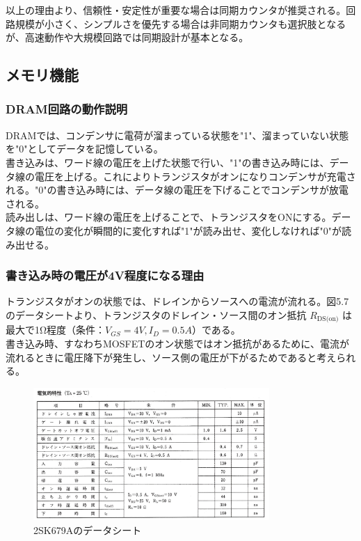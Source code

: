 \documentclass{jlreq}
\numberwithin{equation}{section}
\begin{document}
以上の理由より、信頼性・安定性が重要な場合は同期カウンタが推奨される。回路規模が小さく、シンプルさを優先する場合は非同期カウンタも選択肢となるが、高速動作や大規模回路では同期設計が基本となる。

\subsection{メモリ機能}

\subsubsection{DRAM回路の動作説明}

DRAMでは、コンデンサに電荷が溜まっている状態を"1"、溜まっていない状態を"0"としてデータを記憶している。\\
書き込みは、ワード線の電圧を上げた状態で行い、"1"の書き込み時には、データ線の電圧を上げる。これによりトランジスタがオンになりコンデンサが充電される。"0"の書き込み時には、データ線の電圧を下げることでコンデンサが放電される。\\
読み出しは、ワード線の電圧を上げることで、トランジスタをONにする。データ線の電位の変化が瞬間的に変化すれば"1"が読み出せ、変化しなければ"0"が読み出せる。 \\

\subsubsection{書き込み時の電圧が4V程度になる理由}
トランジスタがオンの状態では、ドレインからソースへの電流が流れる。図5.7のデータシートより、トランジスタのドレイン・ソース間のオン抵抗 $R_{\text{DS(on)}}$ は最大で1Ω程度（条件：$V_{GS}=4V, I_D=0.5A$）である。\\
書き込み時、すなわちMOSFETのオン状態ではオン抵抗があるために、電流が流れるときに電圧降下が発生し、ソース側の電圧が下がるためであると考えられる。

\begin{figure}[H]
  \centering
  \includegraphics[width=0.8\textwidth]{assets/datasheet.png}
  \caption{2SK679Aのデータシート}
\end{figure}
\end{document}
